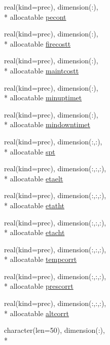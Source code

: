 \begin{DoxyCompactItemize}
\item 
real(kind=prec), dimension(\-:), \\*
allocatable \hyperlink{classinputvar_a1f575248c5370894cd5abbad18ace926}{pecont}
\item 
real(kind=prec), dimension(\-:), \\*
allocatable \hyperlink{classinputvar_a57526f25accbe0af7902997bd9cde614}{firecostt}
\item 
real(kind=prec), dimension(\-:), \\*
allocatable \hyperlink{classinputvar_abeac95d7e558ca06d4456187b380fdbc}{maintcostt}
\item 
real(kind=prec), dimension(\-:), \\*
allocatable \hyperlink{classinputvar_a90d0b599ed6468fc322cf2fbd6b4ec95}{minuptimet}
\item 
real(kind=prec), dimension(\-:), \\*
allocatable \hyperlink{classinputvar_aca351a4427897a65d991d46243fadc34}{mindowntimet}
\item 
real(kind=prec), dimension(\-:,\-:), \\*
allocatable \hyperlink{classinputvar_aa1da1474767137ee483ef4253b7cef85}{spt}
\item 
real(kind=prec), dimension(\-:,\-:,\-:), \\*
allocatable \hyperlink{classinputvar_af7479b2afabbd7d596d91bb1319b0a8e}{etaelt}
\item 
real(kind=prec), dimension(\-:,\-:,\-:), \\*
allocatable \hyperlink{classinputvar_a93c858e92300ce7dfc06627cbc72d681}{etatht}
\item 
real(kind=prec), dimension(\-:,\-:,\-:), \\*
allocatable \hyperlink{classinputvar_a7cd43a0a5d5ddb8d50af96d4c4f81bea}{etacht}
\item 
real(kind=prec), dimension(\-:,\-:,\-:), \\*
allocatable \hyperlink{classinputvar_a918356589b5f04f76333e6a65de35fb8}{tempcorrt}
\item 
real(kind=prec), dimension(\-:,\-:,\-:), \\*
allocatable \hyperlink{classinputvar_a4dc6d715b00d35dbff920be5c37c1d89}{prescorrt}
\item 
real(kind=prec), dimension(\-:,\-:,\-:), \\*
allocatable \hyperlink{classinputvar_a1405821026cba8a541725451f5a6f8dd}{altcorrt}
\item 
character(len=50), dimension(\-:), \\*

\end{DoxyCompactItemize}
